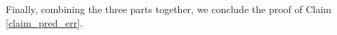 
	Finally, combining the three parts together, we conclude the proof of Claim \ref{claim_pred_err}.

